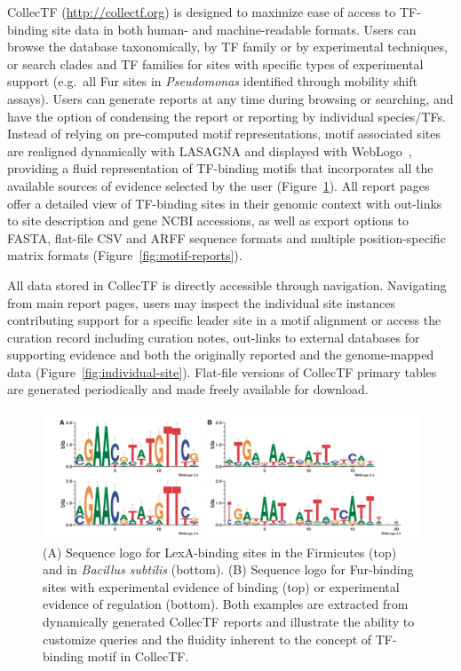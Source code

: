 CollecTF (\url{http://collectf.org}) is designed to maximize ease of access to
TF-binding site data in both human- and machine-readable formats. Users can
browse the database taxonomically, by TF family or by experimental techniques,
or search clades and TF families for sites with specific types of experimental
support (e.g.\ all Fur sites in \textit{Pseudomonas} identified through
mobility shift assays). Users can generate reports at any time during browsing or
searching, and have the option of condensing the report or reporting by
individual species/TFs. Instead of relying on pre-computed motif
representations, motif associated sites are realigned dynamically with LASAGNA
and displayed with WebLogo~\citep{crooks2004weblogo, lee2013lasagna}, providing
a fluid representation of TF-binding motifs that incorporates all the available
sources of evidence selected by the user (Figure~\ref{fig:weblogo}). All report
pages offer a detailed view of TF-binding sites in their genomic context with
out-links to site description and gene NCBI accessions, as well as export
options to FASTA, flat-file CSV and ARFF sequence formats and multiple
position-specific matrix formats (Figure~\ref{fig:motif-reports}).

All data stored in CollecTF is directly accessible through
navigation. Navigating from main report pages, users may inspect the individual
site instances contributing support for a specific leader site in a motif
alignment or access the curation record including curation notes, out-links to
external databases for supporting evidence and both the originally reported and
the genome-mapped data (Figure~\ref{fig:individual-site}). Flat-file versions
of CollecTF primary tables are generated periodically and made freely available
for download.

\begin{figure}
  \centering
  \includegraphics[width=\textwidth]{figures/chapter2/weblogo}
  \caption[Sequence logos for LexA-binding sites in the Firmicutes and
  \textit{Bacillus subtilis}.]{(A) Sequence logo for LexA-binding sites in the
    Firmicutes (top) and in \textit{Bacillus subtilis} (bottom). (B) Sequence
    logo for Fur-binding sites with experimental evidence of binding (top) or
    experimental evidence of regulation (bottom). Both examples are extracted
    from dynamically generated CollecTF reports and illustrate the ability to
    customize queries and the fluidity inherent to the concept of TF-binding
    motif in CollecTF.}
\label{fig:weblogo}
\end{figure}

